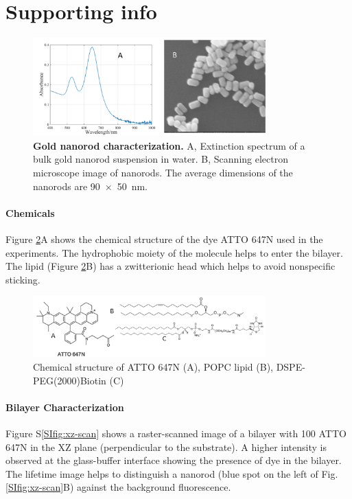 \graphicspath{{chapters/c2_bilayer_efcs/si-figure/}}

\section{Supporting info}
\begin{figure}[ht]
  \centering
  \includegraphics[width=0.8\textwidth]{AuNR_uv-vis_SEM}
  \makeatletter
  \renewcommand{\fnum@figure}{\figurename~S\thefigure}
  \makeatother
  \caption{\textbf{Gold nanorod characterization.} A, Extinction spectrum of a bulk gold nanorod suspension in water. B, Scanning electron microscope image of nanorods.
  The average dimensions of the nanorods are \SI[product-units=repeat]{90x50}{\nm}.}
  \label{SIfig: AuNR_uv-vis}
\end{figure}

\paragraph*{Chemicals}
Figure \ref{SIfig:chemical}A shows the chemical structure of the dye ATTO 647N used in the experiments.
The hydrophobic moiety of the molecule helps to enter the bilayer.
The lipid (Figure \ref{SIfig:chemical}B) has a zwitterionic head which helps to avoid nonspecific sticking.
\begin{figure}[ht]
  \centering
  \includegraphics[width=0.8\textwidth]{chemical_picture}
  \makeatletter
  \renewcommand{\fnum@figure}{\figurename~S\thefigure}
  \makeatother{}
  \caption{Chemical structure of ATTO 647N (A), POPC lipid (B), DSPE-PEG(2000)Biotin (C)}
  \label{SIfig:chemical}
\end{figure}


\paragraph*{Bilayer Characterization}
Figure S\ref{SIfig:xz-scan} shows a raster-scanned image of a bilayer with \SI{100}{\nM} ATTO 647N in the XZ plane (perpendicular to the substrate). 
A higher intensity is observed at the glass-buffer interface showing the presence of dye in the bilayer.
The lifetime image helps to distinguish a nanorod (blue spot on the left of Fig. \ref{SIfig:xz-scan}B) against the background fluorescence.

